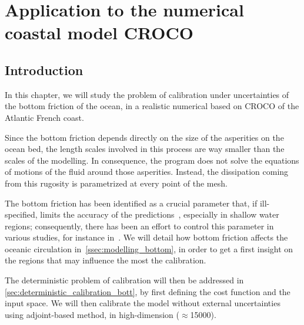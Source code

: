 \documentclass[../../Main_ManuscritThese.tex]{subfiles}
\newcommand{\CROCO}{CROCO}
\begin{document}
\chapter{Application to the numerical coastal model \CROCO}
\label{chap:croco}
\minitoc
\newpage
\subfileLocal{\pagestyle{contentStyle}}

\section{Introduction}
\label{sec:intro_croco}

In this chapter, we will study the problem of calibration under
uncertainties of the bottom friction of the ocean, in a realistic numerical based
on \CROCO{} of the Atlantic French coast.

Since the bottom friction depends directly on the size of the
asperities on the ocean bed, the length scales involved in this
process are way smaller than the scales of the modelling. In
consequence, the program does not solve the equations of motions of
the fluid around those asperities. Instead, the dissipation coming
from this rugosity is parametrized at every point of the mesh.

The bottom friction has been identified as a crucial parameter that,
if ill-specified, limits the accuracy of the
predictions~\citep{sinha_principal_1997,kreitmair_effect_2019},
especially in shallow water regions; consequently, there has been an
effort to control this parameter in various
studies, for instance in~\cite{das_variational_1992,das_estimation_1991,boutet_estimation_2015}.
We will detail how bottom friction affects the oceanic circulation
in~\cref{ssec:modelling_bottom}, in order to get a first insight on
the regions that may influence the most the calibration.

The deterministic problem of calibration will then be addressed in
\cref{sec:deterministic_calibration_bott}, by first defining the cost
function and the input space. We will then calibrate the model without
external uncertainties using adjoint-based method, in high-dimension
($\approx$\num{15000}).
\end{document}
